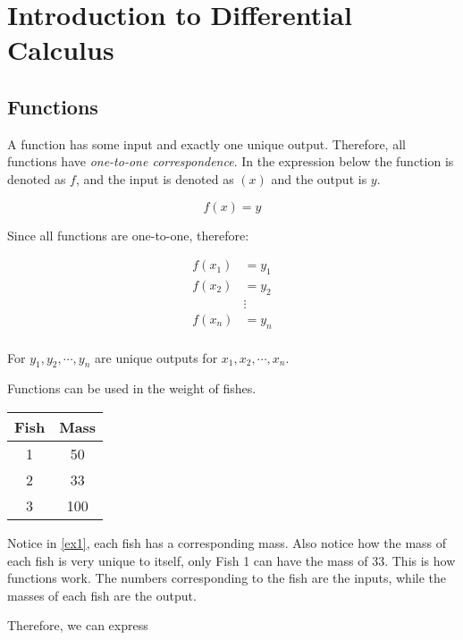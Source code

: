 
\chapter{Introduction to Differential Calculus}

\section{Functions}

A function has some input and exactly one unique output. Therefore, all functions have \emph{one-to-one correspondence}. In the expression below the function is denoted as \(f\), and the input is denoted as \((x)\) and the output is \(y\).

\[
    f(x) = y
\]

Since all functions are one-to-one, therefore:

\begin{align*}
    f(x_1) &= y_1 \\ 
    f(x_2) &= y_2 \\
           &\vdots \\
    f(x_n) &= y_n \\
\end{align*}

For \(y_1, y_2, \cdots, y_n\) are unique outputs for \(x_1, x_2, \cdots, x_n\).

\begin{ex}
    \label{ex1}
    Functions can be used in the weight of fishes.
\end{ex}

\begin{center}
    \begin{tabular}{cc}
        \toprule
        Fish & Mass \\
        \midrule
        1 & 50 \\
        2 & 33 \\
        3 & 100 \\
        \bottomrule
    \end{tabular}
\end{center}

Notice in \cref{ex1}, each fish has a corresponding mass. Also notice how the mass of each fish is very unique to itself, only Fish 1 can have the mass of 33. This is how functions work. The numbers corresponding to the fish are the inputs, while the masses of each fish are the output.

Therefore, we can express

